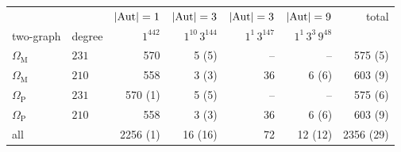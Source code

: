 \begin{tabular}{llrrrrr}
\toprule
 & & $|\mathrm{Aut}|=1$ & $|\mathrm{Aut}|=3$ & $|\mathrm{Aut}|=3$ & $|\mathrm{Aut}|=9$ & total \\
two-graph & degree & $1^{442}$ & $1^{10}\,3^{144}$ & $1^{1}\,3^{147}$ & $1^{1}\,3^{3}\,9^{48}$ & \\
\midrule
$\Omega_{\mathrm M}$ & $231$ & 570 & 5 (5) & -- & -- & 575 (5) \\
$\Omega_{\mathrm M}$ & $210$ & 558 & 3 (3) & 36 & 6 (6) & 603 (9) \\
$\Omega_{\mathrm P}$ & $231$ & 570 (1) & 5 (5) & -- & -- & 575 (6) \\
$\Omega_{\mathrm P}$ & $210$ & 558 & 3 (3) & 36 & 6 (6) & 603 (9) \\
\midrule
all & & 2256 (1) & 16 (16) & 72 & 12 (12) & 2356 (29) \\
\bottomrule
\end{tabular}

